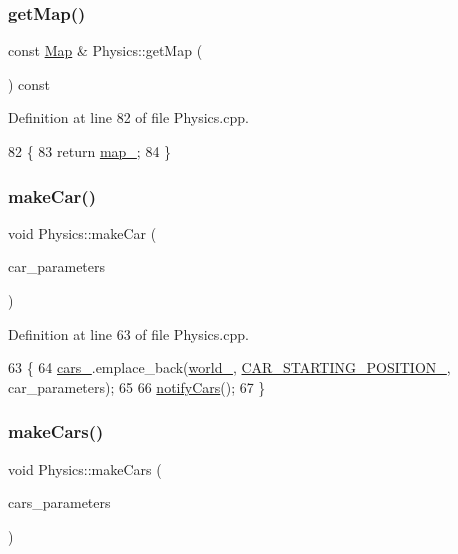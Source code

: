 \subsubsection{\texorpdfstring{get\+Map()}{getMap()}}
{\footnotesize\ttfamily const \hyperlink{classMap}{Map} \& Physics\+::get\+Map (\begin{DoxyParamCaption}{ }\end{DoxyParamCaption}) const}



Definition at line 82 of file Physics.\+cpp.


\begin{DoxyCode}
82                                  \{
83     \textcolor{keywordflow}{return} \hyperlink{classPhysics_a1f2b9c2d5ad391eff5e6ebd5cdf495fe}{map\_};
84 \}
\end{DoxyCode}
\mbox{\label{classPhysics_ad42659995ef232bb751eac09d0a4e8d9}} 
\subsubsection{\texorpdfstring{make\+Car()}{makeCar()}}
{\footnotesize\ttfamily void Physics\+::make\+Car (\begin{DoxyParamCaption}\item[{const \hyperlink{classCarParameters}{Car\+Parameters} \&}]{car\+\_\+parameters }\end{DoxyParamCaption})}



Definition at line 63 of file Physics.\+cpp.


\begin{DoxyCode}
63                                                          \{
64     \hyperlink{classPhysics_ad798f52a18a2e5975f349b1fd95ceefc}{cars\_}.emplace\_back(\hyperlink{classPhysics_a6f9efee327d116528efb9fd16b405bc6}{world\_}, \hyperlink{classPhysics_a960c795e535acff932299971c93aa166}{CAR\_STARTING\_POSITION\_}, car\_parameters);
65 
66     \hyperlink{classPhysics_a466b0a9be955dcf7afd58afdd396a560}{notifyCars}();
67 \}
\end{DoxyCode}
\mbox{\label{classPhysics_a0c2c8ee78b42f9727d420f2fbb624e5a}} 
\subsubsection{\texorpdfstring{make\+Cars()}{makeCars()}}
{\footnotesize\ttfamily void Physics\+::make\+Cars (\begin{DoxyParamCaption}\item[{const std\+::vector$<$ \hyperlink{classCarParameters}{Car\+Parameters} $>$ \&}]{cars\+\_\+parameters }\end{DoxyParamCaption})}



